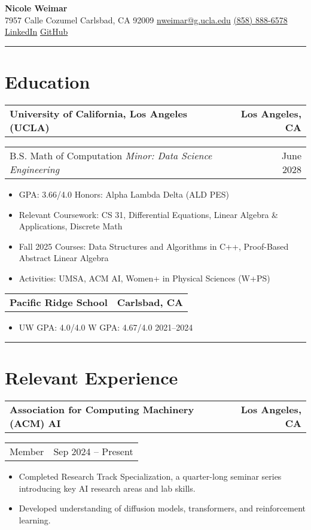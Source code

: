 \documentclass[11pt]{article}
\makeatletter
\newcommand{\entryrow}[2]{%
  \begin{tabular*}{\textwidth}{@{\extracolsep{\fill}} l r}
    #1 & #2 \\
  \end{tabular*}\vspace{-2pt}
}
\makeatother
\begin{document}
{\LARGE \textbf{Nicole Weimar}}\\[4pt]
7957 Calle Cozumel \textbar{} Carlsbad, CA 92009 \textbar{}
\href{mailto:nweimar@g.ucla.edu}{nweimar@g.ucla.edu} \textbar{}
\href{tel:+18588886578}{(858) 888-6578} \textbar{}
\href{https://www.linkedin.com/in/nweimar/}{LinkedIn} \textbar{}
\href{https://github.com/nicoleweimar?tab=repositories}{GitHub}

\vspace{7pt}\hrule\vspace{7pt}

\section*{Education}

\entryrow{\textbf{University of California, Los Angeles (UCLA)}}{\textbf{Los Angeles, CA}}
\entryrow{B.S. Math of Computation \quad \textit{Minor: Data Science Engineering}}{June 2028}
\begin{itemize}
  \item GPA: 3.66/4.0 \quad Honors: Alpha Lambda Delta (ALD \textbar{} PES)
  \item Relevant Coursework: CS 31, Differential Equations, Linear Algebra \& Applications, Discrete Math
  \item Fall 2025 Courses: Data Structures and Algorithms in C++, Proof-Based Abstract Linear Algebra
  \item Activities: UMSA, ACM AI, Women+ in Physical Sciences (W+PS)
\end{itemize}

\entryrow{\textbf{Pacific Ridge School}}{\textbf{Carlsbad, CA}}
\begin{itemize}
  \item UW GPA: 4.0/4.0 \quad W GPA: 4.67/4.0 \hfill 2021--2024
\end{itemize}

\vspace{3pt}\hrule\vspace{7pt}

\section*{Relevant Experience}

\entryrow{\textbf{Association for Computing Machinery (ACM) AI}}{\textbf{Los Angeles, CA}}
\entryrow{Member}{Sep 2024 -- Present}
\begin{itemize}
  \item Completed Research Track Specialization, a quarter-long seminar series introducing key AI research areas and lab skills.
  \item Developed understanding of diffusion models, transformers, and reinforcement learning.
\end{itemize}
\end{document}
